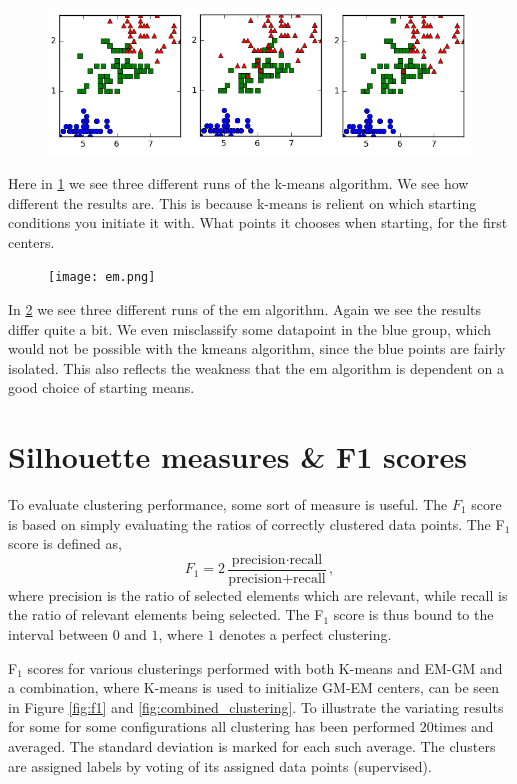 \documentclass[a4paper,10pt,article,oneside,english]{memoir}
\let\oldcaption\caption
\renewcommand{\caption}[1]{\oldcaption{\emph{#1}}}
\begin{document}
\begin{figure}
	\centering
	\includegraphics[width=\textwidth]{kmeans1.png}
	\caption{}
	\label{fig:km}
\end{figure}
Here in \ref{fig:km} we see three different runs of the k-means algorithm. We see how different the results are. This is because k-means is relient on which starting conditions you initiate it with. What points it chooses when starting, for the first centers.
\begin{figure}
	\centering
	\texttt{[image: em.png]}
	\caption{}
	\label{fig:em}
\end{figure}
In \ref{fig:em} we see three different runs of the em algorithm. Again we see the results differ quite a bit. We even misclassify some datapoint in the blue group, which would not be possible with the kmeans algorithm, since the blue points are fairly isolated. This also reflects the weakness that the em algorithm is dependent on a good choice of starting means.




\section*{Silhouette measures \& F1 scores}
To evaluate clustering performance, some sort of measure is useful. The $F_1$ score is based on simply evaluating the ratios of correctly clustered data points. The F$_1$ score is defined as,
$$F_1 = 2 \frac{\text{precision} \cdot \text{recall}}{\text{precision} + \text{recall}},$$
where precision is the ratio of selected elements which are relevant, while recall is the ratio of relevant elements being selected. The F$_1$ score is thus bound to the interval between $0$ and $1$, where $1$ denotes a perfect clustering. 

F$_1$ scores for various clusterings performed with both K-means and EM-GM and a combination, where K-means is used to initialize GM-EM centers, can be seen in Figure \ref{fig:f1} and \ref{fig:combined_clustering}. To illustrate the variating results for some for some configurations all clustering has been performed $20$times and averaged. The standard deviation is marked for each such average. The clusters are assigned labels by voting of its assigned data points (supervised).
\end{document}
